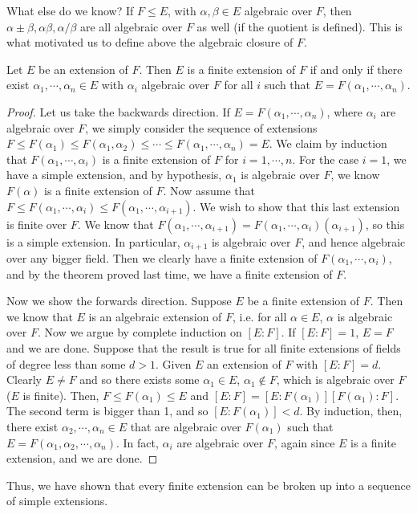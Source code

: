 \documentclass{../mathnotes}
\begin{document}
What else do we know? If $F\leq E$, with $\alpha,\beta\in E$ algebraic over $F$, then $\alpha\pm\beta,\alpha\beta,\alpha/\beta$ are all
algebraic over $F$ as well (if the quotient is defined). This is what motivated us to define above the algebraic closure of $F$.

\begin{lem}
    Let $E$ be an extension of $F$. Then $E$ is a finite extension of $F$ if and only if there exist $\alpha_1,\cdots,\alpha_n\in E$ with
    $\alpha_i$ algebraic over $F$ for all $i$ such that $E=F(\alpha_1,\cdots,\alpha_n)$.
\end{lem}
\begin{proof}
    Let us take the backwards direction. If $E=F(\alpha_1,\cdots,\alpha_n)$, where $\alpha_i$ are algebraic over $F$, we simply
    consider the sequence of extensions $F\leq F(\alpha_1)\leq F(\alpha_1,\alpha_2) \leq \cdots \leq F(\alpha_1,\cdots,\alpha_n)=E$.
    We claim by induction that $F(\alpha_1,\cdots,\alpha_i)$ is a finite extension of $F$ for $i=1,\cdots,n$. For the case $i=1$, we
    have a simple extension, and by hypothesis, $\alpha_1$ is algebraic over $F$, we know $F(\alpha)$ is a finite extension of $F$.
    Now assume that $F\leq F(\alpha_1,\cdots,\alpha_i)\leq F(\alpha_1,\cdots,\alpha_{i+1})$. We wish to show that this last extension
    is finite over $F$. We know that $F(\alpha_1,\cdots,\alpha_{i+1})=F(\alpha_1,\cdots,\alpha_i)(\alpha_{i+1})$, so this is a simple extension.
    In particular, $\alpha_{i+1}$ is algebraic over $F$, and hence algebraic over any bigger field. Then we clearly have a finite extension
    of $F(\alpha_1,\cdots,\alpha_i)$, and by the theorem proved last time, we have a finite extension of $F$.

    Now we show the forwards direction. Suppose $E$ be a finite extension of $F$. Then we know that $E$ is an algebraic extension of $F$,
    i.e. for all $\alpha\in E$, $\alpha$ is algebraic over $F$. Now we argue by complete induction on $[E:F]$. If $[E:F]=1$, $E=F$ and we are done.
    Suppose that the result is true for all finite extensions of fields of degree less than some $d>1$. Given $E$ an extension of $F$ with $[E:F]=d$.
    Clearly $E\neq F$ and so there exists some $\alpha_1\in E$, $\alpha_1\notin F$, which is algebraic over $F$ ($E$ is finite). Then, $F\leq F(\alpha_1)\leq E$
    and $[E:F]=[E:F(\alpha_1)][F(\alpha_1):F]$. The second term is bigger than 1, and so $[E:F(\alpha_1)]<d$. By induction, then, there
    exist $\alpha_2,\cdots,\alpha_n\in E$ that are algebraic over $F(\alpha_1)$ such that $E=F(\alpha_1,\alpha_2,\cdots,\alpha_n)$.
    In fact, $\alpha_i$ are algebraic over $F$, again since $E$ is a finite extension, and we are done.
\end{proof}
Thus, we have shown that every finite extension can be broken up into a sequence of simple extensions.
\end{document}
